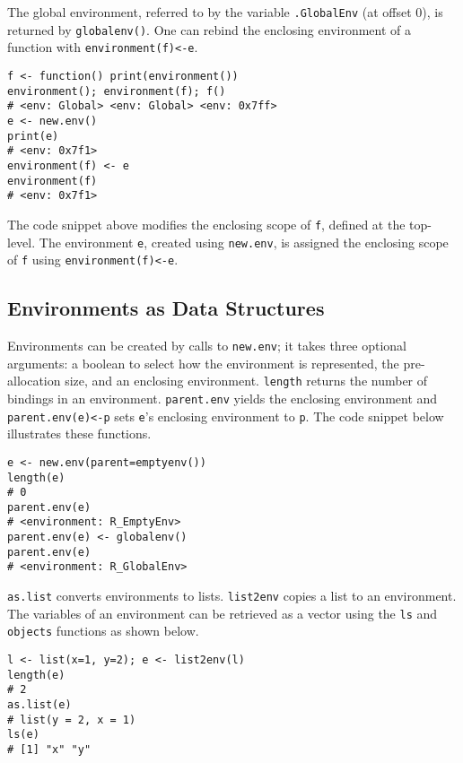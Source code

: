 \documentclass[10pt,sigplan,authorversion=true]{acmart}
\renewcommand{\c}[1]{\lstinline |#1|\xspace}
\newcommand{\newEnv}{\c{new.env}}
\newcommand{\asList}{\c{as.list}}
\newcommand{\listToEnv}{\c{list2env}}
\newcommand{\ls}{\c{ls}}
\newcommand{\objects}{\c{objects}}
\newcommand{\parentEnv}{\c{parent.env}}
\begin{document}
The global environment, referred to by the variable \c{.GlobalEnv} (at offset
0), is returned by \c{globalenv()}. One can rebind the enclosing environment of
a function with \c{environment(f)<-e}.

\begin{lstlisting}
f <- function() print(environment())
environment(); environment(f); f()
# <env: Global> <env: Global> <env: 0x7ff>
e <- new.env()
print(e)
# <env: 0x7f1>
environment(f) <- e
environment(f)
# <env: 0x7f1>
\end{lstlisting}

The code snippet above modifies the enclosing scope of \c{f}, defined at the
top-level. The environment \c{e}, created using \c{new.env}, is assigned the
enclosing scope of \c{f} using \c{environment(f)<-e}.

\subsection{Environments as Data Structures}

Environments can be created by calls to \newEnv; it takes three optional
arguments: a boolean to select how the environment is represented, the
pre-allocation size, and an enclosing environment. \c{length} returns the number
of bindings in an environment. \parentEnv yields the enclosing environment and
\c{parent.env(e)<-p} sets {\small\tt e}'s enclosing environment to \c{p}. The
code snippet below illustrates these functions.

\begin{lstlisting}
e <- new.env(parent=emptyenv())
length(e)
# 0
parent.env(e)
# <environment: R_EmptyEnv>
parent.env(e) <- globalenv()
parent.env(e)
# <environment: R_GlobalEnv>
\end{lstlisting}

\noindent
\asList converts environments to lists. \listToEnv copies a list to an
environment. The variables of an environment can be retrieved as a vector using
the \ls and \objects functions as shown below.

\begin{lstlisting}
l <- list(x=1, y=2); e <- list2env(l)
length(e)
# 2
as.list(e)
# list(y = 2, x = 1)
ls(e)
# [1] "x" "y"
\end{lstlisting}
\end{document}
